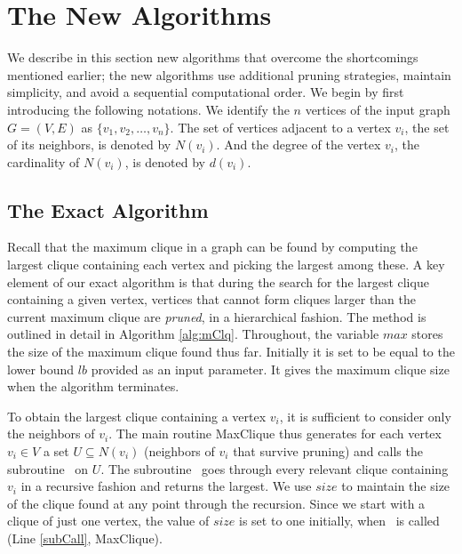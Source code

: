 \section{The New Algorithms}
\label{sec:algorithms}
We describe in this section new algorithms that overcome the shortcomings mentioned earlier; 
the new algorithms use additional pruning strategies, maintain simplicity, and 
avoid a sequential computational order.
We begin by first introducing the following notations.
We identify the $n$ vertices of the input graph $G=(V,E)$ as $\{v_1, v_2, \ldots, v_n\}$.  
The set of vertices adjacent to a vertex $v_i$, the set of its neighbors, is denoted by $N(v_i)$.
And the degree of the vertex $v_i$, the cardinality of $N(v_i)$, is 
denoted by $d(v_i)$.  

\subsection{The Exact Algorithm}
\label{subsec:exact}

Recall that the maximum clique in a graph can be found by computing the largest clique containing each vertex and picking the largest among these. 
A key element of our exact algorithm is that during the search for the largest clique containing a given vertex, vertices that cannot form cliques larger than the current maximum 
clique are {\em pruned}, in a hierarchical fashion. 
The method is outlined in detail in Algorithm \ref{alg:mClq}. 
Throughout, the variable $max$ stores the size of the maximum clique found 
thus far. Initially it is set to be equal to the lower bound $lb$ provided as an input parameter.
It gives the maximum clique size when the algorithm terminates.


To obtain the largest clique containing a vertex $v_i$, 
it is sufficient to consider only the neighbors of $v_i$. 
The main routine {\sc MaxClique} thus generates  for each 
vertex $v_i \in V$ a set $U \subseteq N(v_i)$ 
(neighbors of $v_i$ that survive pruning) and calls the subroutine \clq\ on $U$.  
The subroutine \clq\ goes through every relevant clique containing $v_i$ 
in a recursive fashion and returns the largest.
We use $size$ to maintain the size of the clique found at any point through the recursion.
Since we start with a clique of just one vertex, the value of $size$ is set to one initially, 
when \clq\ is called (Line \ref{subCall}, {\sc MaxClique}).


